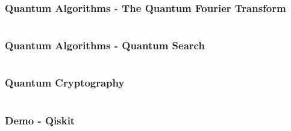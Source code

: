 \documentclass[aspectratio=169]{beamer}
\begin{document}
\begin{frame}
    \frametitle{Quantum Algorithms - The Quantum Fourier Transform}
    \begin{columns}
        \begin{column}{0.5\textwidth}
            
        \end{column}
        \begin{column}{0.5\textwidth}
            
        \end{column}
    \end{columns}
\end{frame}

\begin{frame}
    \frametitle{Quantum Algorithms - Quantum Search}
    \begin{columns}
        \begin{column}{0.5\textwidth}
            
        \end{column}
        \begin{column}{0.5\textwidth}
            
        \end{column}
    \end{columns}
\end{frame}

\begin{frame}
    \frametitle{Quantum Cryptography}
    \begin{columns}
        \begin{column}{0.5\textwidth}
            
        \end{column}
        \begin{column}{0.5\textwidth}
            
        \end{column}
    \end{columns}
\end{frame}

\begin{frame}
    \frametitle{Demo - Qiskit}
    \begin{columns}
        \begin{column}{0.5\textwidth}
            
        \end{column}
        \begin{column}{0.5\textwidth}
            
        \end{column}
    \end{columns}
\end{frame}
\end{document}
